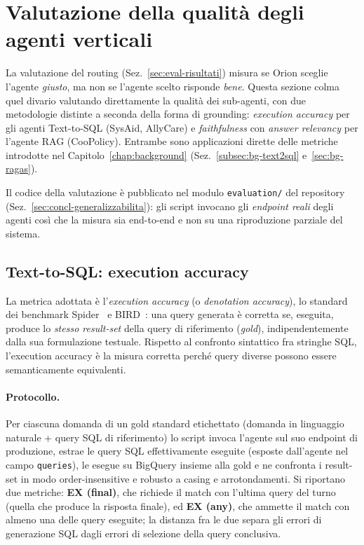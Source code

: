 \section{Valutazione della qualità degli agenti verticali}
\label{sec:eval-agenti}

La valutazione del routing (Sez.~\ref{sec:eval-risultati}) misura se Orion sceglie l'agente \emph{giusto}, ma non se l'agente scelto risponde \emph{bene}. 
Questa sezione colma quel divario valutando direttamente la qualità dei sub-agenti, con due metodologie distinte a seconda della forma di grounding: 
\emph{execution accuracy} per gli agenti Text-to-SQL (SysAid, AllyCare) e \emph{faithfulness} con \emph{answer relevancy} per l'agente RAG (CooPolicy). 
Entrambe sono applicazioni dirette delle metriche introdotte nel Capitolo~\ref{chap:background} (Sez.~\ref{subsec:bg-text2sql} e~\ref{sec:bg-ragas}).

Il codice della valutazione è pubblicato nel modulo \texttt{evaluation/} del repository (Sez.~\ref{sec:concl-generalizzabilita}): 
gli script invocano gli \emph{endpoint reali} degli agenti così che la misura sia end-to-end e non su una riproduzione parziale del sistema.

\subsection{Text-to-SQL: execution accuracy}
\label{subsec:eval-text2sql}

La metrica adottata è l'\emph{execution accuracy} (o \emph{denotation accuracy}), lo standard dei benchmark Spider~\cite{yu2018spider} e 
BIRD~\cite{li2023bird}: una query generata è corretta se, eseguita, produce lo \emph{stesso result-set} della query di riferimento (\emph{gold}), 
indipendentemente dalla sua formulazione testuale. Rispetto al confronto sintattico fra stringhe SQL, l'execution accuracy è la misura corretta perché query 
diverse possono essere semanticamente equivalenti.

\paragraph{Protocollo.} Per ciascuna domanda di un gold standard etichettato (domanda in linguaggio naturale + query SQL di riferimento) lo script invoca l'agente sul suo 
endpoint di produzione, estrae le query SQL effettivamente eseguite (esposte dall'agente nel campo \texttt{queries}),
le esegue su BigQuery insieme alla gold e ne confronta i result-set in modo order-insensitive e robusto a casing e arrotondamenti. 
Si riportano due metriche: \textbf{EX (final)}, che richiede il match con l'ultima query del turno (quella che produce la risposta finale), ed \textbf{EX (any)}, 
che ammette il match con almeno una delle query eseguite; la distanza fra le due separa gli errori di generazione SQL dagli errori di selezione della query conclusiva.

